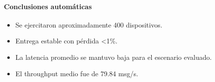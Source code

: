 \paragraph{Conclusiones autom\'aticas}
\begin{itemize}
  \item Se ejercitaron aproximadamente 400 dispositivos.
  \item Entrega estable con p\'erdida <1\%.
  \item La latencia promedio se mantuvo baja para el escenario evaluado.
  \item El throughput medio fue de 79.84 msg/s.
\end{itemize}
\FloatBarrier
